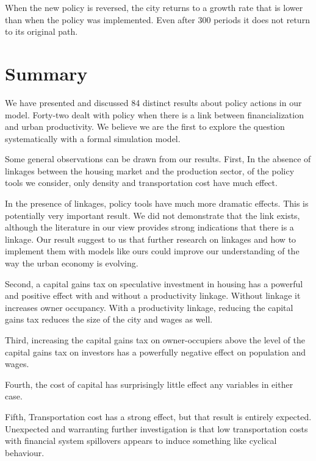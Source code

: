 When the new policy is reversed, the city returns to a growth rate that is lower than when the policy was implemented. Even after 300 periods it does not return to its original path.

\section{Summary}
We have presented and discussed 84 distinct results about policy actions in our model. Forty-two dealt with policy when there is a link between financialization and urban productivity. We believe we are the first to explore the question systematically with a formal simulation model.

Some general observations can be drawn from our results. First, In the absence of linkages between the housing market and the production sector, of the policy tools we consider, only density and transportation cost have much effect. 

In the presence of linkages, policy tools have much more dramatic effects. This is potentially very important result. 
We did not demonstrate that the link exists, although the literature in our view provides strong indications that there is a linkage.  Our result suggest to us that further research on linkages and how to implement them with models like ours could improve our understanding of the way the urban economy is evolving.   


Second, a capital gains tax on speculative investment in housing has a powerful and positive effect with and without a productivity linkage. Without linkage it increases owner occupancy. With a productivity linkage, reducing the capital gains tax reduces the size of the city and wages as well. 

Third, increasing the capital gains tax on owner-occupiers above the level of the capital gains tax on investors has a powerfully negative effect on population and wages.

Fourth, the cost of capital has surprisingly little effect any variables in  either case.

Fifth, Transportation cost has a strong effect, but that result is entirely expected. Unexpected and warranting further investigation is that low transportation costs with financial system spillovers appears to induce something like cyclical behaviour.

